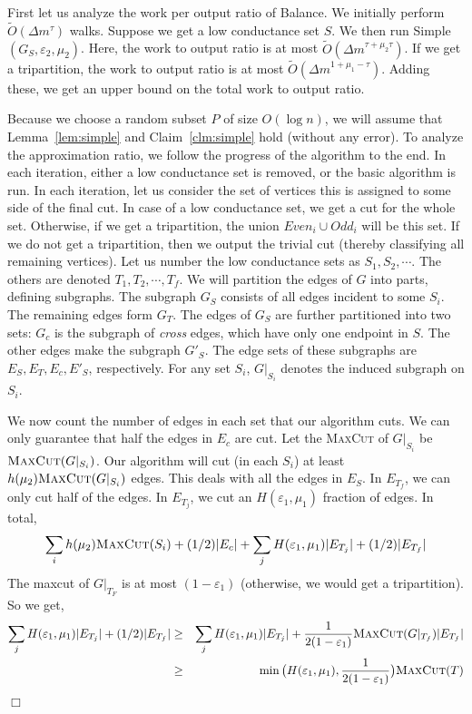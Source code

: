 \documentclass[11pt]{article}
\newenvironment{myproof}{\noindent {\sc Proof:}}{$\Box$}
\def\epsilon{\varepsilon}
\newcommand\Balance{{\sc Balance}\xspace}
\newcommand\Simple{{\sc Simple}\xspace}
\newcommand\otilde{\widetilde{O}}
\def\maxcut{\textsc{MaxCut}\xspace}
\begin{document}
\begin{myproof} First let us analyze the work per output ratio of \Balance.
We initially perform $\otilde(\Delta m^\tau)$ walks. Suppose we get a low
conductance set $S$. We then run {\Simple}$(G_S,\epsilon_2,\mu_2)$.
Here, the work to output ratio is at most $\otilde(\Delta m^{\tau+\mu_2\tau})$.
If we get a tripartition, the work to output ratio
is at most $\otilde(\Delta m^{1+\mu_1-\tau})$. Adding these, we get an
upper bound on the total work to output ratio.

Because we choose a random subset $P$ of size $O(\log n)$,
we will assume that Lemma~\ref{lem:simple} and Claim~\ref{clm:simple}
hold (without any error).
To analyze the approximation ratio, we follow the progress of the algorithm
to the end. In each iteration, either a low conductance set is removed,
or the basic algorithm is run. In each iteration, let us consider
the set of vertices this is assigned to some side of the final cut.
In case of a low conductance set, we get a cut for the whole set.
Otherwise, if we get a tripartition, the union $Even_i \cup Odd_i$
will be this set. If we do not get a tripartition,
then we output the trivial cut (thereby classifying all remaining vertices).
Let us number the low conductance sets
as $S_1, S_2, \cdots$. The others are denoted $T_1,T_2,\cdots,T_f$.
We will partition the edges of $G$ into parts, defining subgraphs.
The subgraph $G_S$ consists of all edges incident to some
$S_i$. The remaining edges form $G_T$. The
edges of $G_S$ are further partitioned into two sets:
$G_c$ is the subgraph of \emph{cross} edges, which have only
one endpoint in $S$. The other edges make the subgraph $G'_S$.
The edge sets of these subgraphs are $E_S, E_T, E_c, E'_S$,
respectively. For any set $S_i$, $G|_{S_i}$ denotes
the induced subgraph on $S_i$.

We now count the number of edges
in each set that our algorithm cuts. We can only
guarantee that half the edges in $E_c$ are cut. Let the
\maxcut of $G|_{S_i}$ be $\maxcut(G|_{S_i})$. Our algorithm will
cut (in each $S_i$) at least $h(\mu_2)\maxcut(G|_{S_i})$ edges.
This deals with all the edges in $E_S$. In $E_{T_f}$, we can
only cut half of the edges. In $E_{T_j}$, we cut an $H(\epsilon_1,\mu_1)$
fraction of edges. In total,
$$ \sum_i h(\mu_2)\maxcut(S_i) + (1/2)|E_c|
+ \sum_j H(\epsilon_1,\mu_1)|E_{T_j}| + (1/2)|E_{T_f}|$$
The maxcut of $G|_{T_F}$ is at most $(1-\epsilon_1)$ (otherwise, we would
get a tripartition). So we get,
\begin{eqnarray*}
\sum_j H(\epsilon_1,\mu_1)|E_{T_j}| + (1/2)|E_{T_f}| & \geq &
\sum_j H(\epsilon_1,\mu_1)|E_{T_j}| + \frac{1}{2(1-\epsilon_1)} \maxcut(G|_{T_f}) |E_{T_f}| \\
& \geq & \min\big(H(\epsilon_1,\mu_1), \frac{1}{2(1-\epsilon_1)}\big) \maxcut(T)
\end{eqnarray*}


\end{myproof}
\end{document}
